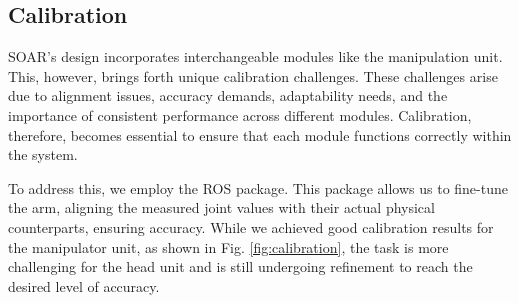 \documentclass[runningheads,a4paper]{llncs}
\begin{document}
\subsection{Calibration}
SOAR’s design incorporates interchangeable modules like the manipulation unit.
This, however, brings forth unique calibration challenges.
These challenges arise due to alignment issues, accuracy demands, adaptability needs, and the importance of consistent performance across different modules.
Calibration, therefore, becomes essential to ensure that each module functions correctly within the system.

To address this, we employ the \cite{ferguson2015robust} ROS package.
This package allows us to fine-tune the arm, aligning the measured joint values with their actual physical counterparts, ensuring accuracy.
While we achieved good calibration results for the manipulator unit, as shown in Fig. \ref{fig:calibration}, the task is more challenging for the head unit and is still undergoing refinement to reach the desired level of accuracy.
\end{document}
